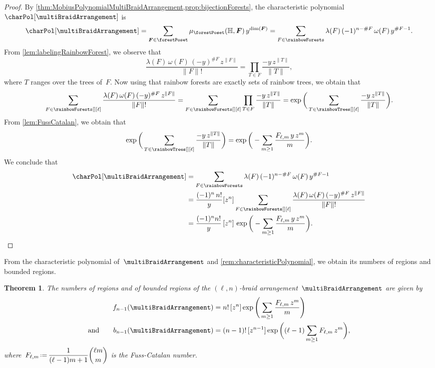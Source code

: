 \documentclass{amsart}
\newtheorem{theorem}{Theorem}[section]
\theoremstyle{definition}
\renewcommand{\b}[1]{{\boldsymbol{#1}}} %
\newcommand{\eqdef}{\mbox{\,\raisebox{0.2ex}{\scriptsize\ensuremath{\mathrm:}}\ensuremath{=}\,}} %
\newcommand{\card}[1]{\##1} %
\renewcommand{\b}[1]{\boldsymbol{#1}} %
\newcommand{\HH}{\mathbb{H}} %
\begin{document}
\begin{proof}
By \cref{thm:MobiusPolynomialMultiBraidArrangement,prop:bijectionForests}, the characteristic polynomial~$\charPol[\multiBraidArrangement]$ is
\[
\charPol[\multiBraidArrangement] = \sum_{\b{F} \in \forestPoset} \mu_{\forestPoset}(\HH, \b{F}) \, y^{\dim(\b{F})} = \sum_{F \in \rainbowForests} \lambda(F) \, (-1)^{n-\card{F}} \, \omega(F) \, y^{\card{F}-1}.
\]
From \cref{lem:labelingRainbowForest}, we observe that
\[
\frac{\lambda(F) \, \omega(F) \, (-y)^{\card{F}} \, z^{\|F\|}}{\|F\|!} = \prod_{T \in F} \frac{-y \, z^{\|T\|}}{\|T\|} ,
\]
where $T$ ranges over the trees of~$F$.
Now using that rainbow forests are exactly sets of rainbow trees, we obtain that
\[
\sum_{F \in \rainbowForests[][\ell]} \frac{ \lambda(F) \, \omega(F) \, (-y)^{\card{F}} \, z^{\|F\|}}{\|F\|!} = \sum_{F \in \rainbowForests[][\ell]} \prod_{T \in F} \frac{-y \, z^{\|T\|}}{\|T\|} = \exp \bigg( \sum_{T \in \rainbowTrees[][\ell]} \frac{-y \, z^{\|T\|}}{\|T\|} \bigg).
\]
From \cref{lem:FussCatalan}, we obtain that
\[
\exp \bigg( \sum_{T \in \rainbowTrees[][\ell]} \frac{-y \, z^{\|T\|}}{\|T\|} \bigg) = \exp \bigg( - \sum_{m \ge 1} \frac{F_{\ell,m} \, y \, z^m}{m} \bigg).
\]
We conclude that
\begin{align*}
\charPol[\multiBraidArrangement] 
& = \sum_{F \in \rainbowForests}  \lambda(F) \, (-1)^{n-\card{F}} \, \omega(F) \, y^{\card{F}-1} \\
& = \frac{(-1)^n \, n!}{y} [z^n] \sum_{F \in \rainbowForests[][\ell]} \frac{ \lambda(F) \, \omega(F) \, (-y)^{\card{F}} \, z^{\|F\|}}{\|F\|!} \\
& = \frac{(-1)^n n!}{y} \, [z^n] \, \exp \bigg( - \sum_{m \ge 1} \frac{F_{\ell,m} \, y \, z^m}{m} \bigg).
\qedhere
\end{align*}
\end{proof}

From the characteristic polynomial of~$\multiBraidArrangement$ and \cref{rem:characteristicPolynomial}, we obtain its numbers of regions and bounded regions.

\begin{theorem}
\label{thm:regionsMultiBraidArrangement}
The numbers of regions and of bounded regions of the $(\ell,n)$-braid arrangement~$\multiBraidArrangement$ are given by
\begin{align*}
f_{n-1}(\multiBraidArrangement) 
& = n! \, [z^n] \exp \Bigg( \sum_{m \ge 1} \frac{F_{\ell,m} \, z^m}{m} \Bigg) \\
\text{and}\qquad
b_{n-1}(\multiBraidArrangement)
& = (n-1)! \, [z^{n-1}] \exp \bigg( (\ell-1) \sum_{m \ge 1} F_{\ell,m} \, z^m \bigg),
\end{align*}
where~$\displaystyle F_{\ell,m} \eqdef \frac{1}{(\ell-1)m+1} \binom{\ell m}{m}$ is the Fuss-Catalan number.
\end{theorem}
\end{document}
